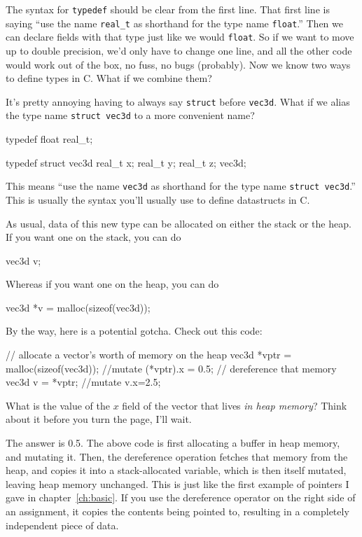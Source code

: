 \documentclass[ebook,11pt,oneside,openany]{memoir}
\newcommand{\cf}[1]{\texttt{#1}}
\begin{document}
The syntax for \cf{typedef} should be clear from the first line. That first line is saying ``use the name \cf{real\_t} as shorthand for the type name \cf{float}.'' Then we can declare fields with that type just like we would \cf{float}. So if we want to move up to double precision, we'd only have to change one line, and all the other code would work out of the box, no fuss, no bugs (probably). Now we know two ways to define types in C. What if we combine them?

It's pretty annoying having to always say \cf{struct} before \cf{vec3d}. What if we alias the type name \cf{struct vec3d} to a more convenient name?

\begin{code}[language=C]
typedef float real_t;

typedef struct vec3d {
        real_t x;
        real_t y;
        real_t z;
} vec3d;
\end{code}
This means ``use the name \cf{vec3d} as shorthand for the type name \cf{struct vec3d}.'' This is usually the syntax you'll usually use to define datastructs in C.

As usual, data of this new type can be allocated on either the stack or the heap. If you want one on the stack, you can do

\begin{code}[language=C]
vec3d v;
\end{code}

\noindent
Whereas if you want one on the heap, you can do

\begin{code}[language=C]
vec3d *v = malloc(sizeof(vec3d));
\end{code}

\pagebreak
\noindent
By the way, here is a potential gotcha. Check out this code:

\begin{code}[language=C]
// allocate a vector's worth of memory on the heap
vec3d *vptr = malloc(sizeof(vec3d));
//mutate
(*vptr).x = 0.5;
// dereference that memory
vec3d v = *vptr;
//mutate
v.x=2.5;
\end{code}

What is the value of the $x$ field of the vector that lives \textit{in heap memory}? Think about it before you turn the page, I'll wait.
\pagebreak

The answer is 0.5. The above code is first allocating a buffer in heap memory, and mutating it. Then, the dereference operation fetches that memory from the heap, and copies it into a stack-allocated variable, which is then itself mutated, leaving heap memory unchanged. This is just like the first example of pointers I gave in chapter~\ref{ch:basic}. If you use the dereference operator on the right side of an assignment, it copies the contents being pointed to, resulting in a completely independent piece of data.
\end{document}
